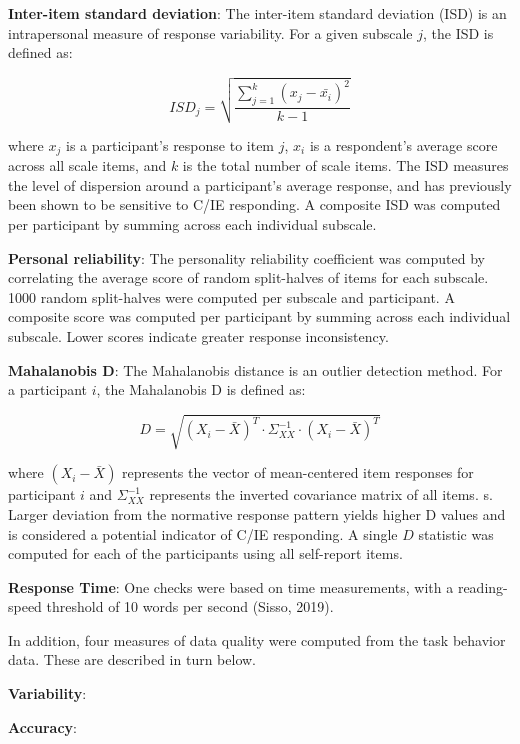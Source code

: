 \documentclass[a4paper,notitlepage,12pt]{article}
\begin{document}
\textbf{Inter-item standard deviation}: The inter-item standard deviation (ISD) is an intrapersonal measure of response variability. For a given subscale $j$, the ISD is defined as:

\begin{equation*}
    ISD_j = \sqrt{\frac{\sum^k_{j=1}(x_j - \bar{x_i})^2}{k-1}}
\end{equation*}

where $x_j$ is a participant's response to item $j$, $x_i$ is a respondent's average score across all scale items, and $k$ is the total number of scale items. The ISD measures the level of dispersion around a participant's average response, and has previously been shown to be sensitive to C/IE responding. A composite ISD was computed per participant by summing across each individual subscale.

\textbf{Personal reliability}: The personality reliability coefficient was computed by correlating the average score of random split-halves of items for each subscale. 1000 random split-halves were computed per subscale and participant.  A composite score was computed per participant by summing across each individual subscale. Lower scores indicate greater response inconsistency.

\textbf{Mahalanobis D}: The Mahalanobis distance is an outlier detection method. For a participant $i$, the Mahalanobis D is defined as:

\begin{equation*}
    D = \sqrt{(X_i - \bar{X})^T \cdot \Sigma^{-1}_{XX} \cdot (X_i - \bar{X})^T }
\end{equation*}

where $(X_i - \bar{X})$ represents the vector of mean-centered item responses for participant $i$ and $\Sigma^{-1}_{XX}$ represents the inverted covariance matrix of all items. s. Larger deviation from the normative response pattern yields higher D values and is considered a potential indicator of C/IE responding. A single $D$ statistic was computed for each of the participants using all self-report items.

\textbf{Response Time}: One checks were based on time measurements, with a reading-speed threshold of 10 words per second (Sisso, 2019).

In addition, four measures of data quality were computed from the task behavior data. These are described in turn below.

\textbf{Variability}: 

\textbf{Accuracy}: 
\end{document}
